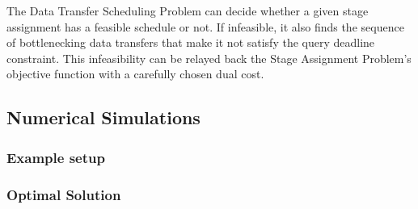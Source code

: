 \begin{conjecture}
	The Data Transfer Scheduling Problem can decide whether a given stage assignment has a feasible schedule or not.
	If infeasible, it also finds the sequence of bottlenecking data transfers that make it not satisfy the query deadline constraint.
	This infeasibility can be relayed back the Stage Assignment Problem's objective function with a carefully chosen dual cost.
\end{conjecture}



\subsection{Numerical Simulations}

\subsubsection{Example setup}


\subsubsection{Optimal Solution}

